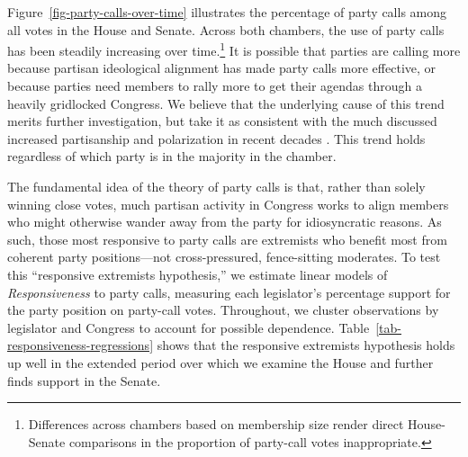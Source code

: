 \documentclass[12pt]{article}
\begin{document}
Figure~\ref{fig-party-calls-over-time} illustrates the percentage of party calls among all votes in the House and Senate.  Across both chambers, the use of party calls has been steadily increasing over time.\footnote{\doublespacing\normalsize
Differences across chambers based on membership size render
direct House-Senate comparisons in the proportion of party-call votes
inappropriate.
}  It is possible that parties are calling more because partisan ideological alignment has made party calls more effective, or because parties need members to rally more to get their agendas through a heavily gridlocked Congress.  We believe that the underlying cause of this trend merits further investigation, but take it as consistent with the much discussed increased partisanship and polarization in recent decades \citep[e.g.,][]{Aldrich:2000, Lee:2009, Lee:2016, Theriault:2013, Smith:2014}. This trend holds regardless of which party is in the majority in the chamber.


The fundamental idea of the theory of party calls is that, rather than solely winning close votes, much partisan activity in Congress works to align members who might otherwise wander away from the party for idiosyncratic reasons.  As such, those most responsive to party calls are extremists who benefit most from coherent party positions---not cross-pressured, fence-sitting moderates.  To test this ``responsive extremists hypothesis,'' we estimate linear models of \textit{Responsiveness} to party calls, measuring each legislator's percentage support for the party position on party-call votes.  Throughout, we cluster observations by legislator and Congress to account for possible dependence.  Table~\ref{tab-responsiveness-regressions} shows that the responsive extremists hypothesis holds up well in the extended period over which we examine the House and further finds support in the Senate.
\end{document}
